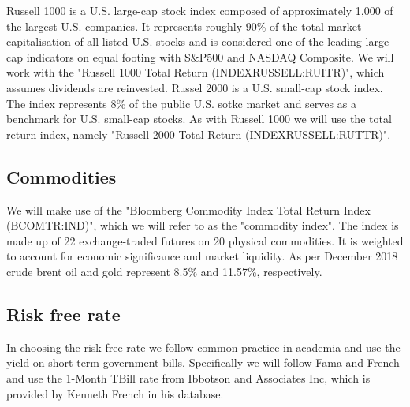\documentclass[11pt,a4paper,oneside]{article}
\begin{document}
Russell 1000 is a U.S. large-cap stock index  composed of approximately 1,000 of the largest U.S. companies. It represents roughly 90\% of the total market capitalisation of all listed U.S. stocks and is considered one of the leading large cap indicators on equal footing with S\&P500 and NASDAQ Composite. We will work with the "Russell 1000 Total Return (INDEXRUSSELL:RUITR)", which assumes dividends are reinvested. Russel 2000 is a U.S. small-cap stock index. The index represents 8\% of the public U.S. sotkc market and serves as a benchmark for U.S. small-cap stocks. As with Russell 1000 we will use the total return index, namely "Russell 2000 Total Return (INDEXRUSSELL:RUTTR)". 

\subsection*{Commodities}
\noindent We will make use of the "Bloomberg Commodity Index Total Return Index (BCOMTR:IND)", which we will refer to as the "commodity index". The index is made up of 22 exchange-traded futures on 20 physical commodities. It is weighted to account for economic significance and market liquidity. As per December 2018 crude brent oil and gold represent 8.5\% and 11.57\%, respectively. 

\subsection*{Risk free rate}
\noindent In choosing the risk free rate  we follow common practice in academia and use the yield on short term government bills\cite{riskfreerate}. Specifically we will follow Fama and French and use the 1-Month TBill rate from Ibbotson and Associates Inc, which is provided by Kenneth French in his database. 
\end{document}
